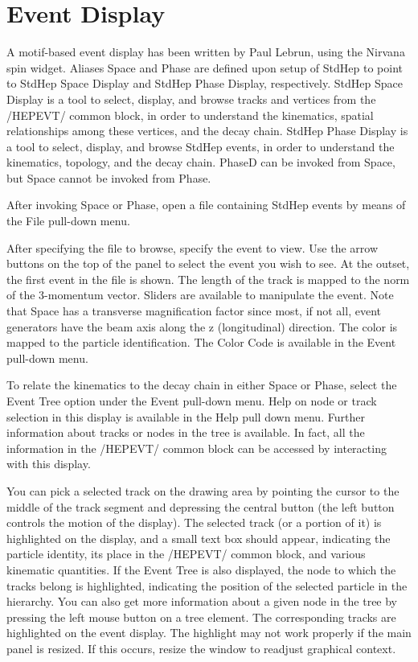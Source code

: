 \section { Event Display}

A motif-based event display has been written by Paul Lebrun, using
the Nirvana spin widget.
Aliases Space and Phase are defined
upon setup of StdHep to point to StdHep Space Display and StdHep Phase
Display, respectively.
StdHep Space Display is a tool to select, display, and browse
tracks and vertices from the /HEPEVT/ common block,
in order to understand the kinematics,
spatial relationships among these vertices, and the decay chain.
StdHep Phase Display is a tool to select, display, and browse StdHep events,
in order to understand the kinematics, topology, and the decay chain.
PhaseD can be invoked from Space, but Space cannot be invoked from Phase.

After invoking Space or Phase, open a
file containing StdHep events by means of the File pull-down menu.

After specifying the file to browse, specify the event to view.
Use the arrow buttons on the top of the panel to select the event you
wish to see.
At the outset, the first event in the file is shown.
The length of the track is mapped to the norm of the 3-momentum vector.
Sliders are available to manipulate the event.
Note that Space has a transverse magnification factor
since most, if not all, event generators have the beam axis along the z
(longitudinal) direction.
The color is mapped to the particle identification.
The Color Code is available in the Event pull-down menu.

To relate the kinematics to the decay chain in either Space or Phase,
select the Event Tree option under the Event pull-down menu.
Help on node or track selection in this display is available
in the Help pull down menu.
Further information about tracks or nodes in the tree is available.
In fact, all the information in the /HEPEVT/ common block
can be accessed by interacting with this display.

You can pick a selected track on the drawing area by pointing
the cursor to the middle of the track segment and depressing
the central button (the left button controls the motion of the display).
The selected track (or a portion of it) is highlighted on the display,
and a small text box should appear,
indicating the particle identity, its place in the /HEPEVT/ common block,
and various kinematic quantities. If the Event Tree is also displayed,
the node to which the tracks belong is highlighted,
indicating the position of the selected particle in the hierarchy.
You can also get more information about a given node in the tree
by pressing  the left mouse button on a tree element.
The corresponding tracks are  highlighted on the event display.
The highlight may not work properly if the main panel is resized.
If this occurs, resize the window to readjust graphical context.
